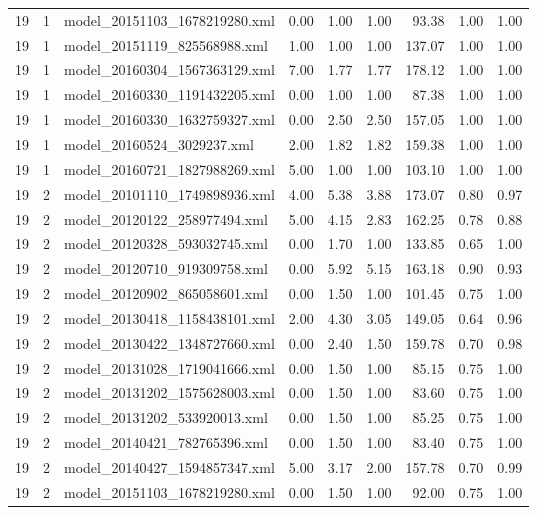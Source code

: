 \begin{table}[ht]
\begin{tabular}{rrlrrrrrr}
   19 &   1 & model\_20151103\_1678219280.xml & 0.00 & 1.00 & 1.00 & 93.38 & 1.00 & 1.00 \\ 
   19 &   1 & model\_20151119\_825568988.xml & 1.00 & 1.00 & 1.00 & 137.07 & 1.00 & 1.00 \\ 
   19 &   1 & model\_20160304\_1567363129.xml & 7.00 & 1.77 & 1.77 & 178.12 & 1.00 & 1.00 \\ 
   19 &   1 & model\_20160330\_1191432205.xml & 0.00 & 1.00 & 1.00 & 87.38 & 1.00 & 1.00 \\ 
   19 &   1 & model\_20160330\_1632759327.xml & 0.00 & 2.50 & 2.50 & 157.05 & 1.00 & 1.00 \\ 
   19 &   1 & model\_20160524\_3029237.xml & 2.00 & 1.82 & 1.82 & 159.38 & 1.00 & 1.00 \\ 
   19 &   1 & model\_20160721\_1827988269.xml & 5.00 & 1.00 & 1.00 & 103.10 & 1.00 & 1.00 \\ 
   19 &   2 & model\_20101110\_1749898936.xml & 4.00 & 5.38 & 3.88 & 173.07 & 0.80 & 0.97 \\ 
   19 &   2 & model\_20120122\_258977494.xml & 5.00 & 4.15 & 2.83 & 162.25 & 0.78 & 0.88 \\ 
   19 &   2 & model\_20120328\_593032745.xml & 0.00 & 1.70 & 1.00 & 133.85 & 0.65 & 1.00 \\ 
   19 &   2 & model\_20120710\_919309758.xml & 0.00 & 5.92 & 5.15 & 163.18 & 0.90 & 0.93 \\ 
   19 &   2 & model\_20120902\_865058601.xml & 0.00 & 1.50 & 1.00 & 101.45 & 0.75 & 1.00 \\ 
   19 &   2 & model\_20130418\_1158438101.xml & 2.00 & 4.30 & 3.05 & 149.05 & 0.64 & 0.96 \\ 
   19 &   2 & model\_20130422\_1348727660.xml & 0.00 & 2.40 & 1.50 & 159.78 & 0.70 & 0.98 \\ 
   19 &   2 & model\_20131028\_1719041666.xml & 0.00 & 1.50 & 1.00 & 85.15 & 0.75 & 1.00 \\ 
   19 &   2 & model\_20131202\_1575628003.xml & 0.00 & 1.50 & 1.00 & 83.60 & 0.75 & 1.00 \\ 
   19 &   2 & model\_20131202\_533920013.xml & 0.00 & 1.50 & 1.00 & 85.25 & 0.75 & 1.00 \\ 
   19 &   2 & model\_20140421\_782765396.xml & 0.00 & 1.50 & 1.00 & 83.40 & 0.75 & 1.00 \\ 
   19 &   2 & model\_20140427\_1594857347.xml & 5.00 & 3.17 & 2.00 & 157.78 & 0.70 & 0.99 \\ 
   19 &   2 & model\_20151103\_1678219280.xml & 0.00 & 1.50 & 1.00 & 92.00 & 0.75 & 1.00 \\ 

\end{tabular}
\end{table}
